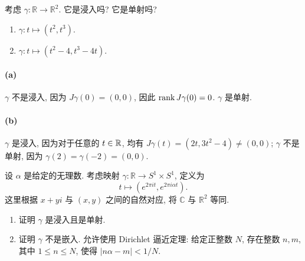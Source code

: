 \documentclass{article}
\begin{document}
\begin{problem}
  考虑 $\gamma:\mathbb{R}\to\mathbb{R}^2$. 它是浸入吗? 它是单射吗?
  \begin{enumerate}
    \item[(a)] $\gamma:t\mapsto(t^2,t^3)$.
    \item[(b)] $\gamma:t\mapsto(t^2-4,t^3-4t)$.
  \end{enumerate}
\end{problem}

\begin{solution}
	\paragraph{(a)} $\gamma$ 不是浸入, 因为 $J\gamma(0) = (0,0)$, 因此 $\operatorname{rank} J\gamma(0) = 0$. $\gamma$ 是单射.

	\paragraph{(b)} $\gamma$ 是浸入, 因为对于任意的 $t \in \mathbb{R}$, 均有 $J\gamma(t) = (2t, 3t^2-4) \ne (0,0)$; $\gamma$ 不是单射, 因为 $\gamma(2) = \gamma(-2) = (0,0)$. 
\end{solution}



\begin{problem}
  设 $\alpha$ 是给定的无理数. 考虑映射 $\gamma:\mathbb{R}\to S^1\times S^1$, 定义为
  \[
    t\mapsto(e^{2\pi it},e^{2\pi i\alpha t}).
  \]
  这里根据 $x+yi$ 与 $(x,y)$ 之间的自然对应, 将 $\mathbb{C}$ 与 $\mathbb{R}^2$ 等同.
  \begin{enumerate}
    \item[(a)] 证明 $\gamma$ 是浸入且是单射.
    \item[(b)] 证明 $\gamma$ 不是嵌入. 允许使用 Dirichlet 逼近定理: 给定正整数 $N$, 存在整数 $n,m$, 其中 $1\leq n\leq N$, 使得 $|n\alpha-m|<1/N$.
  \end{enumerate}
\end{problem}
\end{document}
